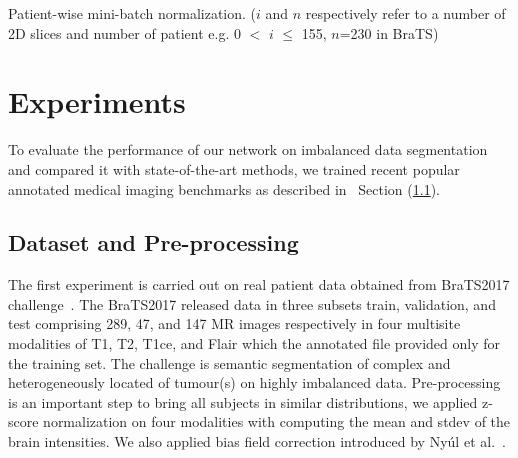 \documentclass[10pt,twocolumn,letterpaper]{article}
\begin{document}
\begin{algorithm} 

    
 
\caption{Patient-wise mini-batch normalization. ($i$ and $n$ respectively refer to a number of 2D slices and number of patient e.g. 0 $<$ $i$ $\leq$ 155, $n$=230 in BraTS)}
\label{minibatch_alg}
\end{algorithm}

\section{Experiments}\label{experiment}
To evaluate the performance of our network on imbalanced data segmentation and compared it with state-of-the-art methods, we trained recent popular annotated medical imaging benchmarks as described in~ Section (\ref{datasets}).

\subsection{Dataset and Pre-processing}\label{datasets}

The first experiment is carried out on real patient data obtained from BraTS2017 challenge~\cite{Menze2014,Bakasnature2017,Bakastcg2017,Bakaslgg2017}.
The BraTS2017 released data in three subsets train, validation, and test comprising 289, 47, and 147 MR images respectively in four multisite modalities of T1, T2, T1ce, and Flair which the annotated file provided only for the training set. The challenge is semantic segmentation of complex and heterogeneously located of tumour(s) on highly imbalanced data. Pre-processing is an important step to bring all subjects in similar distributions, we applied z-score normalization on four modalities with computing the mean and stdev of the brain intensities. We also applied bias field correction introduced by Ny{\'u}l et al.~\cite{nyul2000new}.
\end{document}
